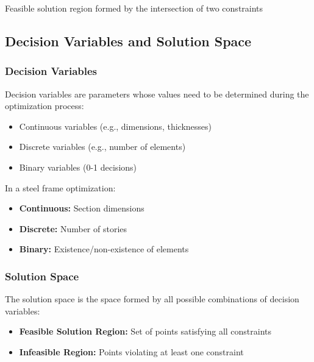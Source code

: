 \begin{marginfigure}
\centering
{}
\caption{Feasible solution region formed by the intersection of two constraints}
\label{fig:feasible_region}
\end{marginfigure}

\subsection{Decision Variables and Solution Space}

\subsubsection{Decision Variables}
Decision variables are parameters whose values need to be determined during the optimization process:
\begin{itemize}
    \item Continuous variables (e.g., dimensions, thicknesses)
    \item Discrete variables (e.g., number of elements)
    \item Binary variables (0-1 decisions)
\end{itemize}

\begin{tcolorbox}[title=Decision Variables in Structural Design]
In a steel frame optimization:
\begin{itemize}
    \item \textbf{Continuous:} Section dimensions
    \item \textbf{Discrete:} Number of stories
    \item \textbf{Binary:} Existence/non-existence of elements
\end{itemize}
\end{tcolorbox}

\subsubsection{Solution Space}
The solution space is the space formed by all possible combinations of decision variables:
\begin{itemize}
    \item \textbf{Feasible Solution Region:} Set of points satisfying all constraints
    \item \textbf{Infeasible Region:} Points violating at least one constraint
\end{itemize}

